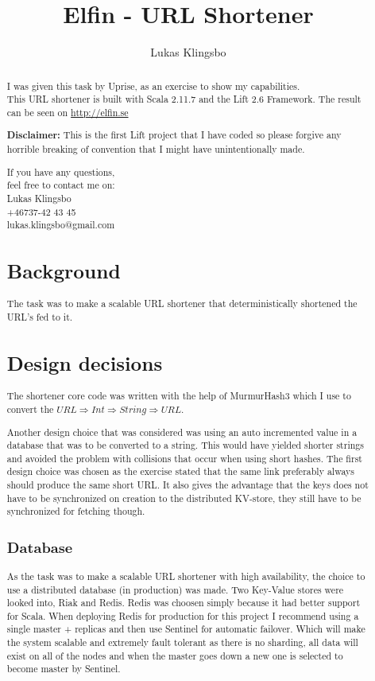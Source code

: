 \documentclass[a4paper,12pt]{article}
\title{\textbf{Elfin - URL Shortener}}
\author{Lukas Klingsbo}
\begin{document}
\maketitle

\begin{abstract}
I was given this task by Uprise, as an exercise to show my capabilities.\\
This URL shortener is built with Scala 2.11.7 and the Lift 2.6 Framework.
The result can be seen on \url{http://elfin.se}

\textbf{Disclaimer:} This is the first Lift project that I have 
coded so please forgive any horrible breaking of convention 
that I might have unintentionally made. 
\begin{center}
If you have any questions,\\
feel free to contact me on:\\
\vspace{10pt}
Lukas Klingsbo\\
+46737-42 43 45\\
lukas.klingsbo@gmail.com\\
\end{center}

\section{Background}
The task was to make a scalable URL shortener that deterministically shortened 
the URL's fed to it.

\section{Design decisions}
The shortener core code was written with the help of MurmurHash3 which I use 
to convert the $URL \Rightarrow Int \Rightarrow String \Rightarrow URL$. 

Another design choice that was considered was using an auto incremented value 
in a database that was to be converted to a string. This would have yielded 
shorter strings and avoided the problem with collisions that occur when using 
short hashes. The first design choice was chosen as the exercise stated that 
the same link preferably always should produce the same short URL. It also 
gives the advantage that the keys does not have to be synchronized on creation 
to the distributed KV-store, they still have to be synchronized for fetching 
though.

\subsection{Database}
As the task was to make a scalable URL shortener with high availability, the 
choice to use a distributed database (in production) was made.
Two Key-Value stores were looked into, Riak and Redis. Redis was choosen simply 
because it had better support for Scala. When deploying Redis for production 
for this project I recommend using a single master + replicas and then use 
Sentinel for automatic failover. Which will make the system scalable and 
extremely fault tolerant as there is no sharding, all data will exist on all 
of the nodes and when the master goes down a new one is selected to become 
master by Sentinel.


\end{abstract}
\end{document}
